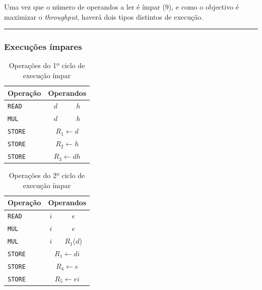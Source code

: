 Uma vez que o número de operandos a ler é ímpar ($9$), e como o objectivo é maximizar o \emph{throughput}, haverá dois tipos distintos de execução.

\noindent\rule{\linewidth}{0.4pt}

\begin{multicols}{2}

	\subsubsection{Execuções ímpares}

	\begin{table}[H]
		\centering
		\begin{tabular}{l|c|c}
			Operação & \multicolumn{2}{c}{Operandos} \\
			\hline
			\texttt{READ} & $d$ & $h$ \\
			\hline
			\texttt{MUL} & $d$ & $h$ \\
			\hline
			\texttt{STORE} & \multicolumn{2}{c}{$R_1\leftarrow d$} \\
			\texttt{STORE} & \multicolumn{2}{c}{$R_2\leftarrow h$} \\
			\texttt{STORE} & \multicolumn{2}{c}{$R_3\leftarrow dh$} \\
		\end{tabular}
		\caption{Operações do 1º ciclo de execução ímpar}
		\label{tab:odd_1}
	\end{table}

	\begin{table}[H]
		\centering
		\begin{tabular}{l|c|c}
			Operação & \multicolumn{2}{c}{Operandos} \\
			\hline
			\texttt{READ} & $i$ & $e$ \\
			\hline
			\texttt{MUL} & $i$ & $e$ \\
			\texttt{MUL} & $i$ & $R_1$($d$) \\
			\hline
			\texttt{STORE} & \multicolumn{2}{c}{$R_1\leftarrow di$} \\
			\texttt{STORE} & \multicolumn{2}{c}{$R_4\leftarrow e$} \\
			\texttt{STORE} & \multicolumn{2}{c}{$R_5\leftarrow ei$} \\
		\end{tabular}
		\caption{Operações do 2º ciclo de execução ímpar}
		\label{tab:odd_2}
	\end{table}


\end{multicols}
